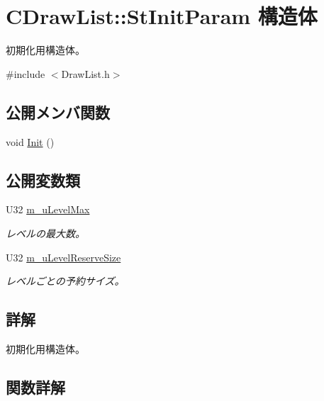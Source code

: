 \hypertarget{struct_c_draw_list_1_1_st_init_param}{}\section{C\+Draw\+List\+:\+:St\+Init\+Param 構造体}
\label{struct_c_draw_list_1_1_st_init_param}


初期化用構造体。  




{\ttfamily \#include $<$Draw\+List.\+h$>$}

\subsection*{公開メンバ関数}
\begin{DoxyCompactItemize}
\item 
void \hyperlink{struct_c_draw_list_1_1_st_init_param_ae258cf1b8a6cd36a1158eabe891dd38c}{Init} ()
\end{DoxyCompactItemize}
\subsection*{公開変数類}
\begin{DoxyCompactItemize}
\item 
U32 \hyperlink{struct_c_draw_list_1_1_st_init_param_a2d9c6ff936ead819fc83bfe453aa0e25}{m\+\_\+u\+Level\+Max}
\begin{DoxyCompactList}\small\item\em レベルの最大数。 \end{DoxyCompactList}\item 
U32 \hyperlink{struct_c_draw_list_1_1_st_init_param_a23c952aba5f550e3d8baafd8125c549b}{m\+\_\+u\+Level\+Reserve\+Size}
\begin{DoxyCompactList}\small\item\em レベルごとの予約サイズ。 \end{DoxyCompactList}\end{DoxyCompactItemize}


\subsection{詳解}
初期化用構造体。 

\subsection{関数詳解}
\hypertarget{struct_c_draw_list_1_1_st_init_param_ae258cf1b8a6cd36a1158eabe891dd38c}{}
